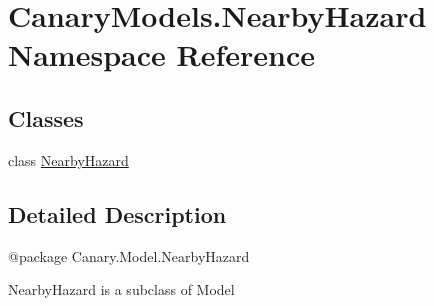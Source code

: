 \hypertarget{namespace_canary_models_1_1_nearby_hazard}{\section{Canary\-Models.\-Nearby\-Hazard Namespace Reference}
\label{namespace_canary_models_1_1_nearby_hazard}
}
\subsection*{Classes}
\begin{DoxyCompactItemize}
\item 
class \hyperlink{class_canary_models_1_1_nearby_hazard_1_1_nearby_hazard}{Nearby\-Hazard}
\end{DoxyCompactItemize}


\subsection{Detailed Description}
\begin{DoxyVerb}@package Canary.Model.NearbyHazard

NearbyHazard is a subclass of Model
\end{DoxyVerb}
 